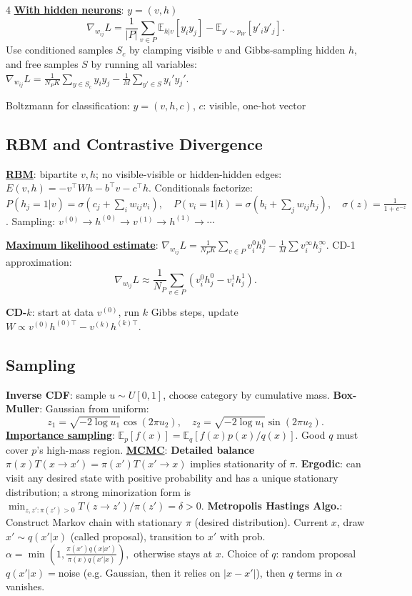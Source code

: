 \documentclass{article}
\newcommand{\key}[1]{\textbf{#1}}
\newcommand{\lowterm}[1]{\textbf{\underline{#1}}}
\newcommand{\E}{\mathbb{E}}
\newcommand{\1}{\mathbf 1}
\begin{document}
\begin{multicols*}{4}
\lowterm{With hidden neurons}: $y=(v,h)$
\[
\nabla_{w_{ij}} L=\frac{1}{|P|}\sum_{v\in P} \E_{h|v}[y_iy_j]-\E_{y'\sim p_W}[y'_iy'_j].
\]
Use conditioned samples $S_c$ by clamping visible $v$ and Gibbs-sampling hidden $h$, and free samples $S$ by running all variables: $\nabla_{w_{ij}}L=\frac1{N_PK}\sum_{y\in S_c}y_iy_j-\frac1M\sum_{y'\in S}y_i'y_j'$.

Boltzmann for classification: $y=(v,h,c)$, $c$: visible, one-hot vector


\subsection{RBM and Contrastive Divergence}
\lowterm{RBM}: bipartite $v,h$; no visible-visible or hidden-hidden edges:
\(
E(v,h)=-v^\top Wh-b^\top v-c^\top h.
\)
Conditionals factorize:
\(
P(h_j=1|v)=\sigma(c_j+\sum_iw_{ij}v_i),\quad
P(v_i=1|h)=\sigma(b_i+\sum_jw_{ij}h_j),\quad \sigma(z)=\frac{1}{1+e^{-z}}
\). Sampling: $v^{(0)}\to h^{(0)}\to v^{(1)}\to h^{(1)}\to\cdots$

\lowterm{Maximum likelihood estimate}: $\nabla_{w_{ij}}L=\frac{1}{N_PK}\sum_{v\in P}v_i^{0}h_j^{0}-\frac{1}{M}\sum v_i^{\infty}h_j^{\infty}$. CD-1 approximation:
\[
\nabla_{w_{ij}}L\approx \frac1{N_P}\sum_{v\in P}(v_i^0h_j^0-v_i^1h_j^1).
\]

\key{CD-$k$}: start at data $v^{(0)}$, run $k$ Gibbs steps, update $W\propto v^{(0)}h^{(0)\top}-v^{(k)}h^{(k)\top}$.

\subsection{Sampling}
\key{Inverse CDF}: sample $u\sim U[0,1]$, choose category by cumulative mass. \key{Box-Muller}: Gaussian from uniform:
\[
z_1=\sqrt{-2\log u_1}\cos(2\pi u_2),\quad z_2=\sqrt{-2\log u_1}\sin(2\pi u_2).
\]
\lowterm{Importance sampling}: $\E_p[f(x)]=\E_q[f(x)p(x)/q(x)]$. Good $q$ must cover $p$'s high-mass region.
\lowterm{MCMC}: \key{Detailed balance} $\pi(x)T(x\to x')=\pi(x')T(x'\to x)$ implies stationarity of $\pi$. \key{Ergodic}: can visit any desired state with positive probability and has a unique stationary distribution; a strong minorization form is $\min_{z,z':\pi(z')>0}T(z\to z')/\pi(z')=\delta>0$. \key{Metropolis Hastings Algo.}: Construct Markov chain with stationary $\pi$ (desired distribution). Current $x$, draw $x'\sim q(x'|x)$ (called proposal), transition to $x'$ with prob. 
\(
\alpha=\min\left(1,\frac{\pi(x')q(x|x')}{\pi(x)q(x'|x)}\right),
\)
otherwise stays at $x$. 
Choice of $q$: random proposal $q(x'|x)=$noise (e.g. Gaussian, then it relies on $|x-x'|$), then $q$ terms in $\alpha$ vanishes. 


\end{multicols*}
\end{document}
